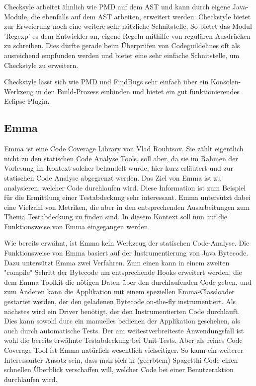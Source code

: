 Checksyle arbeitet ähnlich wie PMD auf dem AST und kann durch eigene Java-Module, die ebenfalls auf dem AST arbeiten, erweitert werden. Checkstyle bietet zur Erweierung noch eine weitere sehr nützliche Schnitstelle. So bietet das Modul 'Regexp' es dem Entwickler an, eigene Regeln mithilfe von regulären Ausdrücken zu schreiben. Dies dürfte gerade beim Überprüfen von Codeguildelines oft als ausreichend empfunden werden und bietet eine sehr einfache Schnitstelle, um Checkstyle zu erweitern.

Checkstyle lässt sich wie PMD und FindBugs sehr einfach über ein Konsolen-Werkzeug in den Build-Prozess einbinden und bietet ein gut funktionierendes Eclipse-Plugin.


\subsection{Emma}

Emma ist eine Code Coverage Library von Vlad Roubtsov. Sie zählt eigentlich nicht zu den statischen Code Analyse Tools, soll aber, da sie im Rahmen der Vorlesung im Kontext solcher behandelt wurde, hier kurz erläutert und zur statischen Code Analyse abgegrenzt werden. 
Das Ziel von Emma ist zu analysieren, welcher Code durchlaufen wird. Diese Information ist zum Beispiel für die Ermittlung einer Testabdeckung sehr interessant. Emma untersützt dabei eine Vielzahl von Metriken, die aber in den entsprechenden Ausarbeitungen zum Thema Testabdeckung zu finden sind. In diesem Kontext soll nun auf die Funktionsweise von Emma eingegangen werden.

Wie bereits erwähnt, ist Emma kein Werkzeug der statischen Code-Analyse. Die Funktionsweise von Emma basiert auf der Instrumentierung von Java Bytecode. Dazu untersützt Emma zwei Verfahren. Zum einen kann in einem zweiten "compile" Schritt der Bytecode um entsprechende Hooks erweitert werden, die dem Emma Toolkit die nötigen Daten über den durchlaufenden Code geben, und zum Anderen kann die Applikation mit einem speziellen Emma-Classloader gestartet werden, der den geladenen Bytecode on-the-fly instrumentiert. Als nächstes wird ein Driver benötigt, der den Instrumentierten Code durchläuft. Dies kann sowohl durc ein manuelles bedienen der Applikation geschehen, als auch durch automatische Tests. Der am weitestverbreiteste Anwendungsfall ist wohl die bereits erwähnte Testabdeckung bei Unit-Tests. Aber als reines Code Coverage Tool ist Emma natürlich wesentlich vielseitiger. So kann ein weiterer Interessanter Ansatz sein, dass man sich in (geerbtem) Spagetthi-Code einen schnellen Überblick verschaffen will, welcher Code bei einer Benutzeraktion durchlaufen wird.


